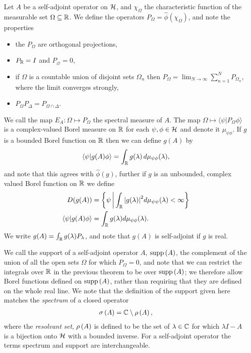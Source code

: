 \begin{thm}\label{thm:spectral-sa-ops-unbounded-functions}
  Let $A$ be a self-adjoint operator on $\mathcal{H}$, and $\chi_\Omega$ the characteristic function of the measurable set $\Omega\subseteq\mathbb{R}$. We define the operators $P_\Omega = \hat{\phi}(\chi_\Omega)$, and note the properties
  \begin{itemize}
    \item the $P_\Omega$ are orthogonal projections,
    \item $P_{\mathbb{R}} = I$ and $P_\varnothing = 0$,
    \item if $\Omega$ is a countable union of disjoint sets $\Omega_n$ then $P_\Omega = \lim_{N\to\infty} \sum_{n=1}^N P_{\Omega_n}$, where the limit converges strongly,
    \item $P_\Omega P_\Delta = P_{\Omega\cap\Delta}$.
  \end{itemize}
  We call the map $E_A:\Omega\mapsto P_\Omega$ the spectral measure of $A$. The map $\Omega\mapsto\langle\psi| P_\Omega \phi\rangle$ is a complex-valued Borel measure on $\mathbb{R}$ for each $\psi, \phi\in\mathcal{H}$ and denote it $\mu_{\psi\phi}$. If $g$ is a bounded Borel function on $\mathbb{R}$ then we can define $g(A)$ by
  \begin{align}
    \langle \psi|g(A)\phi\rangle = \int_{\mathbb{R}} g(\lambda)\,d\mu_{\psi\phi}(\lambda),
  \end{align}
  and note that this agrees with $\hat{\phi}(g)$, further if $g$ is an unbounded, complex valued Borel function on $\mathbb{R}$ we define 
  \begin{align}
    D(g(A)) &= \left\{\psi\,\middle|\,\int_{\mathbb{R}} {\left\lvert{g(\lambda)}\right\rvert}^2 d\mu_{\psi\psi}(\lambda)<\infty\right\}\\
    \langle \psi | g(A)\phi\rangle &= \int_{\mathbb{R}} g(\lambda) d\mu_{\psi\phi}(\lambda).
  \end{align}
  We write $g(A) = \int_{\mathbb{R}} g(\lambda) P_\lambda$, and note that $g(A)$ is self-adjoint if $g$ is real. 
\end{thm}
We call the support of a self-adjoint operator $A$, $\operatorname{supp}\left({A}\right)$, the complement of the union of all the open sets $\Omega$ for which $P_\Omega = 0$, and note that we can restrict the integrals over $\mathbb{R}$ in the previous theorem to be over $\operatorname{supp}\left({A}\right)$; we therefore allow Borel functions defined on $\operatorname{supp}\left({A}\right)$, rather than requiring that they are defined on the whole real line. We note that the definition of the support given here matches the \emph{spectrum} of a closed operator
\begin{align}
  \sigma\left({A}\right) = \mathbb{C} \setminus \rho\left({A}\right),
\end{align}
where the \emph{resolvant set}, $\rho\left({A}\right)$ is defined to be the set of $\lambda\in\mathbb{C}$ for which $\lambda I - A$ is a bijection onto $\mathcal{H}$ with a bounded inverse. For a self-adjoint operator the terms spectrum and support are interchangeable. 


